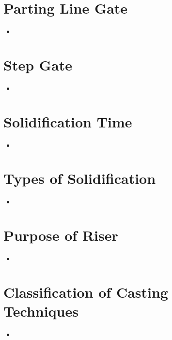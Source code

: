 \documentclass[8pt]{report}
\begin{document}
\section{Parting Line Gate}
	\begin{itemize}
		\item
	\end{itemize}\hrulefill
\section{Step Gate}
	\begin{itemize}
		\item
	\end{itemize}\hrulefill
\section{Solidification Time}
	\begin{itemize}
		\item
	\end{itemize}\hrulefill
\section{Types of Solidification}
	\begin{itemize}
		\item
	\end{itemize}\hrulefill
\section{Purpose of Riser}
	\begin{itemize}
		\item
	\end{itemize}\hrulefill
\section{Classification of Casting Techniques}
	\begin{itemize}
		\item
	\end{itemize}\hrulefill
\end{document}
